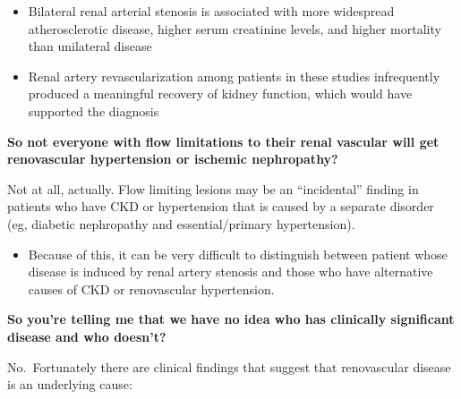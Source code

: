 \documentclass[
]{book}
\providecommand{\tightlist}{%
  \setlength{\itemsep}{0pt}\setlength{\parskip}{0pt}}
\begin{document}
\begin{itemize}
\item
  Bilateral renal arterial stenosis is associated with more widespread
  atherosclerotic disease, higher serum creatinine levels, and higher
  mortality than unilateral disease
\item
  Renal artery revascularization among patients in these studies
  infrequently produced a meaningful recovery of kidney function,
  which would have supported the diagnosis
\end{itemize}

\textbf{So not everyone with flow limitations to their renal vascular will get
renovascular hypertension or ischemic nephropathy?}

Not at all, actually. Flow limiting lesions may be an ``incidental''
finding in patients who have CKD or hypertension that is caused by a
separate disorder (eg, diabetic nephropathy and essential/primary
hypertension).

\begin{itemize}
\tightlist
\item
  Because of this, it can be very difficult to distinguish between
  patient whose disease is induced by renal artery stenosis and those
  who have alternative causes of CKD or renovascular hypertension.
\end{itemize}

\textbf{So you're telling me that we have no idea who has clinically
significant disease and who doesn't?}

No.~Fortunately there are clinical findings that suggest that
renovascular disease is an underlying cause:
\end{document}
